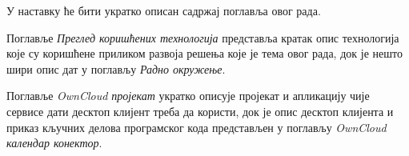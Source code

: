 У наставку ће бити укратко описан садржај поглавља овог рада.

Поглавље \textit{Преглед коришћених технологија} представља кратак опис технологија које су коришћене приликом развоја решења које је тема овог рада, док је нешто шири опис дат у поглављу \textit{Радно окружење}.

Поглавље \textit{OwnCloud пројекат} укратко описује пројекат и апликацију чије сервисе дати десктоп клијент треба да користи, док је опис десктоп клијента и приказ кључних делова програмског кода представљен у поглављу \textit{OwnCloud календар конектор}. 